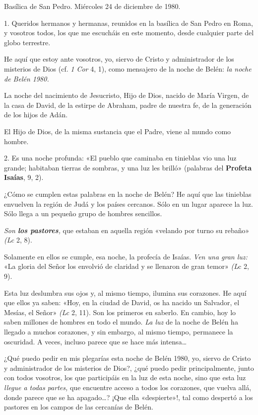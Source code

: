 \documentclass[]{article}
\begin{document}
Basílica de San Pedro. Miércoles 24 de diciembre de 1980.

1. Queridos hermanos y hermanas, reunidos en la basílica de San Pedro en
Roma, y vosotros todos, los que me escucháis en este momento, desde
cualquier parte del globo terrestre.

He aquí que estoy ante vosotros, yo, siervo de Cristo y administrador de
los misterios de Dios (cf. \emph{1 Cor} 4, 1), como mensajero de la
noche de Belén: \emph{la noche de Belén 1980.}

La noche del nacimiento de Jesucristo, Hijo de Dios, nacido de María
Virgen, de la casa de David, de la estirpe de Abraham, padre de nuestra
fe, de la generación de los hijos de Adán.

El Hijo de Dios, de la misma sustancia que el Padre, viene al mundo como
hombre.

2. Es una noche profunda: «El pueblo que caminaba en tinieblas vio una
luz grande; habitaban tierras de sombras, y una luz les brilló»
(palabras del \textbf{Profeta Isaías}, 9, 2).

¿Cómo se cumplen estas palabras en la noche de Belén? He aquí que las
tinieblas envuelven la región de Judá y los países cercanos. Sólo en un
lugar aparece la luz. Sólo llega a un pequeño grupo de hombres
sencillos.

\emph{Son \textbf{los pastores},} que estaban en aquella región «velando
por turno su rebaño» \emph{(Lc} 2, 8).

Solamente en ellos se cumple, esa noche, la profecía de Isaías.
\emph{Ven una gran luz:} «La gloria del Señor los envolvió de claridad y
se llenaron de gran temor» \emph{(L}c 2, 9).

Esta luz deslumbra sus ojos y, al mismo tiempo, ilumina sus corazones.
He aquí que ellos ya saben: «Hoy, en la ciudad de David, os ha nacido un
Salvador, el Mesías, el Señor» \emph{(Lc} 2, 11). Son los primeros en
saberlo. En cambio, hoy lo saben millones de hombres en todo el mundo.
\emph{La luz} de la noche de Belén ha llegado a muchos corazones, y sin
embargo, al mismo tiempo, permanece la oscuridad. A veces, incluso
parece que se hace más intensa\ldots{}

¿Qué puedo pedir en mis plegarías esta noche de Belén 1980, yo, siervo
de Cristo y administrador de los misterios de Dios?, ¿qué puedo pedir
principalmente, junto con todos vosotros, los que participáis en la luz
de esta noche, sino que esta luz \emph{llegue a todas partes,} que
encuentre acceso a todos los corazones, que vuelva allá, donde parece
que se ha apagado\ldots{}? ¡Que ella «despierte»!, tal como despertó a
los pastores en los campos de las cercanías de Belén.
\end{document}
